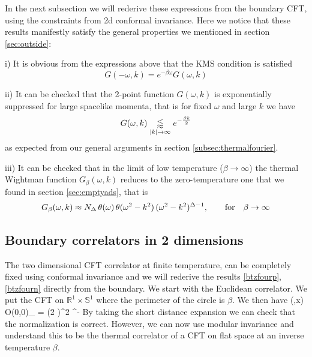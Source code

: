 In the next subsection we will rederive these expressions from the boundary CFT, using the constraints from 2d conformal invariance. Here we notice that these results manifestly 
satisfy the general properties we mentioned in section \ref{sec:outside}:

i) It is obvious from the expressions above that the KMS condition is satisfied 
\[
 G(-\omega,k) = e^{-\beta \omega} G(\omega,k)
\]

ii) It can be checked that the 2-point function $G(\omega,k)$ is exponentially suppressed for large spacelike momenta, that is for fixed $\omega$ and large $k$ we have
\[ 
 G(\omega,k) \underset{|k| \rightarrow \infty}{ \lessapprox} e^{-{\beta k \over 2}}
\]
as expected from our general arguments in section \ref{subsec:thermalfourier}.

iii) It can be checked that in the limit of low temperature ($\beta\rightarrow \infty$) the thermal Wightman function $G_\beta(\omega,k)$ reduces to the zero-temperature one 
that we found in section \ref{sec:emptyads}, that is
$$
G_\beta(\omega,k) \approx N_\Delta \,\theta(\omega)\,\theta(\omega^2-k^2)\, (\omega^2 - k^2)^{\Delta-1} ,\qquad {\rm for}\quad \beta\rightarrow \infty
$$
\subsection{Boundary correlators in 2 dimensions}
The two
dimensional CFT correlator at finite temperature, can be completely fixed using conformal invariance and we will rederive the results \eqref{btzfourp}, \eqref{btzfourn} directly from the boundary.
We start with the Euclidean correlator. We put the CFT on ${\mathbb R}^1\times {\mathbb S}^1$ where the perimeter of the circle is $\beta$. We then have
\be
\label{exact2dcorrelator}
(\tau,x) {\cal O}(0,0)\rangle_{\beta} = \left({2\pi \over \beta} \right)^{2\Delta} ^{-\Delta}
 \ee
By taking the short distance expansion we can check that the normalization is correct.
However, we can now use modular invariance and understand this to be
the thermal correlator of a CFT on flat space at an inverse
temperature $\beta$.  

